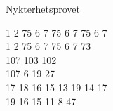 \begin{song}{Nykterhetsprovet}

    
	
	1 2 75 6 7 75 6 7 75 6 7\\
	1 2 75 6 7 75 6 7 73\\
	107 103 102\\
	107 6 19 27\\
	17 18 16 15 13 19 14 17\\
	19 16 15 11 8 47
	
\end{song}
